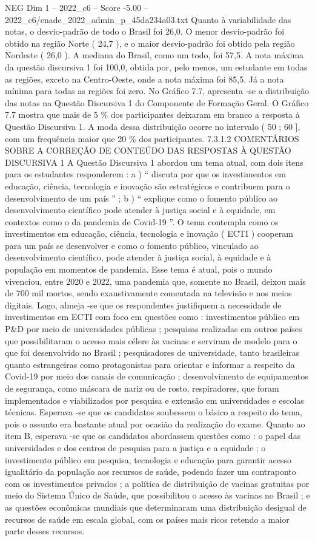 \begin{textsample}{NEG Dim 1 – 2022\_c6 – Score -5.00 – 2022\_c6/enade\_2022\_admin\_p\_45da234a03.txt}
Quanto à variabilidade das notas, o desvio-padrão de todo o Brasil foi 26,0.
O menor desvio-padrão foi obtido na região Norte ( 24,7 ), e o maior desvio-padrão foi obtido pela região Nordeste ( 26,0 ).
A mediana do Brasil, como um todo, foi 57,5.
A nota máxima da questão discursiva 1 foi 100,0, obtida por, pelo menos, um estudante em todas as regiões, exceto na Centro-Oeste, onde a nota máxima foi 85,5.
Já a nota mínima para todas as regiões foi zero.
No Gráfico 7.7, apresenta -se a distribuição das notas na Questão Discursiva 1 do Componente de Formação Geral.
O Gráfico 7.7 mostra que mais de 5 \% dos participantes deixaram em branco a resposta à Questão Discursiva 1.
A moda dessa distribuição ocorre no intervalo ( 50 ; 60 ], com um frequência maior que 20 \% dos participantes. 7.3.1.2 COMENTÁRIOS SOBRE A CORREÇÃO DE CONTEÚDO DAS RESPOSTAS À QUESTÃO DISCURSIVA 1 A Questão Discursiva 1 abordou um tema atual, com dois itens para os estudantes responderem : a ) “ discuta por que os investimentos em educação, ciência, tecnologia e inovação são estratégicos e contribuem para o desenvolvimento de um país ” ; b ) “ explique como o fomento público ao desenvolvimento científico pode atender à justiça social e à equidade, em contextos como o da pandemia de Covid-19 ”.
O tema contempla como os investimentos em educação, ciência, tecnologia e inovação ( ECTI ) cooperam para um país se desenvolver e como o fomento público, vinculado ao desenvolvimento científico, pode atender à justiça social, à equidade e à população em momentos de pandemia.
Esse tema é atual, pois o mundo vivenciou, entre 2020 e 2022, uma pandemia que, somente no Brasil, deixou mais de 700 mil mortos, sendo exaustivamente comentada na televisão e nos meios digitais.
Logo, almeja -se que os respondentes justifiquem a necessidade de investimentos em ECTI com foco em questões como : investimentos público em P\&D por meio de universidades públicas ; pesquisas realizadas em outros países que possibilitaram o acesso mais célere às vacinas e serviram de modelo para o que foi desenvolvido no Brasil ; pesquisadores de universidade, tanto brasileiras quanto estrangeiras como protagonistas para orientar e informar a respeito da Covid-19 por meio dos canais de comunicação ; desenvolvimento de equipamentos de segurança, como máscara de nariz ou de rosto, respiradores, que foram implementados e viabilizados por pesquisa e extensão em universidades e escolas técnicas.
Esperava -se que os candidatos soubessem o básico a respeito do tema, pois o assunto era bastante atual por ocasião da realização do exame.
Quanto ao item B, esperava -se que os candidatos abordassem questões como : o papel das universidades e dos centros de pesquisa para a justiça e a equidade ; o investimento público em pesquisa, tecnologia e educação para garantir acesso igualitário da população aos recursos de saúde, podendo fazer um contraponto com os investimentos privados ; a política de distribuição de vacinas gratuitas por meio do Sistema Único de Saúde, que possibilitou o acesso às vacinas no Brasil ; e as questões econômicas mundiais que determinaram uma distribuição desigual de recursos de saúde em escala global, com os países mais ricos retendo a maior parte desses recursos.

\end{textsample}
